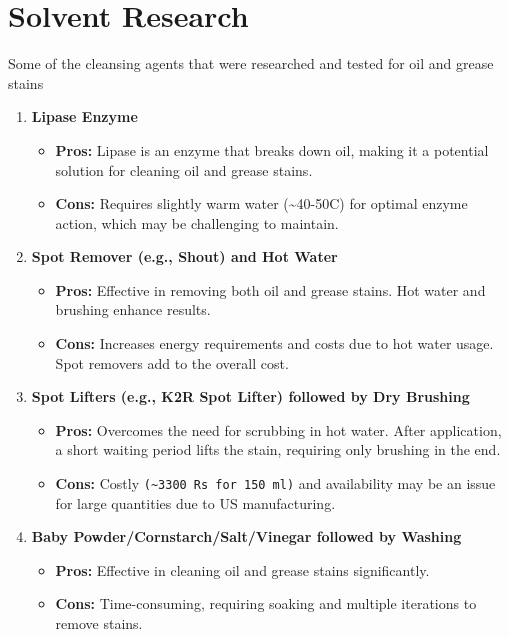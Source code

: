 \documentclass[table]{rapportCS}
\begin{document}
\clearpage
\section{Solvent Research}
Some of the cleansing agents that were researched and tested for oil and grease stains

\begin{enumerate}
    \item \textbf{Lipase  Enzyme}
    \begin{itemize}[label=$\bullet$]
        \item \textbf{Pros:} Lipase is an enzyme that breaks down oil, making it a potential solution for cleaning oil and grease stains.
        \item \textbf{Cons:} Requires slightly warm water (\textasciitilde40-50\textdegree C) for optimal enzyme action, which may be challenging to maintain.
    \end{itemize}

    \item \textbf{Spot Remover (e.g., Shout) and Hot Water}
    \begin{itemize}[label=$\bullet$]
        \item \textbf{Pros:} Effective in removing both oil and grease stains. Hot water and brushing enhance results.
        \item \textbf{Cons:} Increases energy requirements and costs due to hot water usage. Spot removers add to the overall cost.
    \end{itemize}

    \item \textbf{Spot Lifters (e.g., K2R Spot Lifter) followed by Dry Brushing}
    \begin{itemize}[label=$\bullet$]
        \item \textbf{Pros:} Overcomes the need for scrubbing in hot water. After application, a short waiting period lifts the stain, requiring only brushing in the end.
        \item \textbf{Cons:} Costly \texttt{(\textasciitilde{3300} Rs for 150 ml)} and availability may be an issue for large quantities due to US manufacturing.
    \end{itemize}

    \item \textbf{Baby Powder/Cornstarch/Salt/Vinegar followed by Washing}
    \begin{itemize}[label=$\bullet$]
        \item \textbf{Pros:} Effective in cleaning oil and grease stains significantly.
        \item \textbf{Cons:} Time-consuming, requiring soaking and multiple iterations to remove stains.
    \end{itemize}


\end{enumerate}
\end{document}
